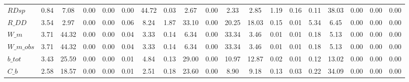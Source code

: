 \begin{center}
\begin{longtable}{lcccccccccccccccccc}
$RDsp               $	 & 	             0.84	 & 	             7.08	 & 	             0.00	 & 	             0.00	 & 	             0.00	 & 	            44.72	 & 	             0.03	 & 	             2.67	 & 	             0.00	 & 	             2.33	 & 	             2.85	 & 	             1.19	 & 	             0.16	 & 	             0.11	 & 	            38.03	 & 	             0.00	 & 	             0.00	 & 	             0.00 \\ 
$R\_DD              $	 & 	             3.54	 & 	             2.97	 & 	             0.00	 & 	             0.00	 & 	             0.06	 & 	             8.24	 & 	             1.87	 & 	            33.10	 & 	             0.00	 & 	            20.25	 & 	            18.03	 & 	             0.15	 & 	             0.01	 & 	             5.34	 & 	             6.45	 & 	             0.00	 & 	             0.00	 & 	             0.00 \\ 
$W\_m               $	 & 	             3.71	 & 	            44.32	 & 	             0.00	 & 	             0.00	 & 	             0.04	 & 	             3.33	 & 	             0.14	 & 	             6.34	 & 	             0.00	 & 	            33.34	 & 	             3.46	 & 	             0.01	 & 	             0.01	 & 	             0.18	 & 	             5.13	 & 	             0.00	 & 	             0.00	 & 	             0.00 \\ 
$W\_m\_obs          $	 & 	             3.71	 & 	            44.32	 & 	             0.00	 & 	             0.00	 & 	             0.04	 & 	             3.33	 & 	             0.14	 & 	             6.34	 & 	             0.00	 & 	            33.34	 & 	             3.46	 & 	             0.01	 & 	             0.01	 & 	             0.18	 & 	             5.13	 & 	             0.00	 & 	             0.00	 & 	             0.00 \\ 
$b\_tot             $	 & 	             3.43	 & 	            25.59	 & 	             0.00	 & 	             0.00	 & 	             0.01	 & 	             4.84	 & 	             0.13	 & 	            29.00	 & 	             0.00	 & 	            10.97	 & 	            12.87	 & 	             0.02	 & 	             0.01	 & 	             0.12	 & 	            13.02	 & 	             0.00	 & 	             0.00	 & 	             0.00 \\ 
$C\_b               $	 & 	             2.58	 & 	            18.57	 & 	             0.00	 & 	             0.00	 & 	             0.01	 & 	             2.51	 & 	             0.18	 & 	            23.60	 & 	             0.00	 & 	             8.90	 & 	             9.18	 & 	             0.13	 & 	             0.03	 & 	             0.22	 & 	            34.09	 & 	             0.00	 & 	             0.00	 & 	             0.00 \\ 

\end{longtable}
\end{center}
